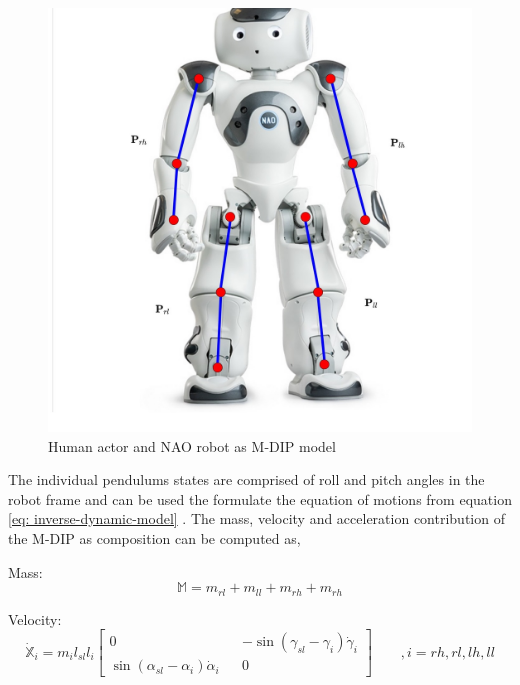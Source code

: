 \begin{figure}[h!]
    \includegraphics[scale=0.2]{images/flowchart-NAO-pendulum.jpg}\hfill
    \caption{Human actor and NAO robot as M-DIP model }\hfill
    \label{fig: human-mdip}
\end{figure}

The individual pendulums states are comprised of roll and pitch angles in the robot frame and can be used the formulate the equation of motions from equation \ref{eq: inverse-dynamic-model} \cite{pierro2012stabilizer}.
The mass, velocity and acceleration contribution of the M-DIP as composition can be computed as,

Mass:
\begin{equation}
    \label{eq: MDIP-mass}
    \mathbb{M} = m_{rl} + m_{ll} + m_{rh} + m_{rh}
\end{equation}

Velocity:
\begin{equation}
    \label{eq: MDIP-velocity}
    \mathbb{\dot{X}}_i = m_il_{sl}l_i\begin{bmatrix}
        0 && -\sin(\gamma_{sl} - \gamma_i)\dot{\gamma}_i \\
        \sin(\alpha_{sl} - \alpha_i)\dot{\alpha}_i && 0
    \end{bmatrix} \qquad \mathit{,i = rh, rl, lh, ll}
\end{equation}


